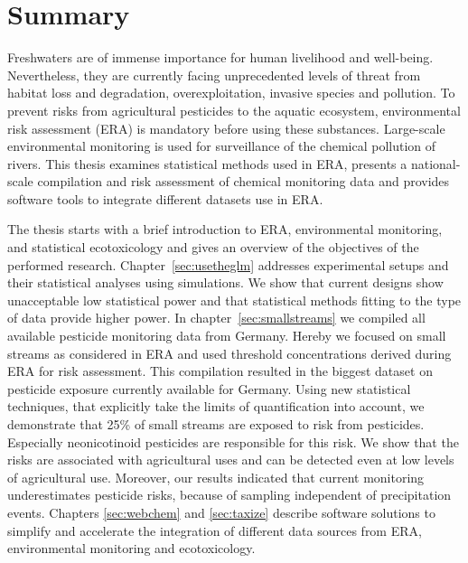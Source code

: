 



\thispagestyle{empty}
\begingroup
\let\clearpage\relax
\let\cleardoublepage\relax
\let\cleardoublepage\relax
\chapter*{Summary}
\thispagestyle{empty}

Freshwaters are of immense importance for human livelihood and well-being.
Nevertheless, they are currently facing unprecedented levels of threat from habitat loss and degradation, overexploitation, invasive species and
pollution. To prevent risks from agricultural pesticides to the aquatic ecosystem, environmental risk assessment (ERA) is mandatory before using these substances. Large-scale environmental monitoring is used for surveillance of the chemical pollution of rivers. 
This thesis examines statistical methods used in ERA, presents a national-scale compilation and risk assessment of chemical monitoring data and provides software tools to integrate different datasets use in ERA.

The thesis starts with a brief introduction to ERA, environmental monitoring, and statistical ecotoxicology and gives an overview of the objectives of the performed research.
Chapter~\ref{sec:usetheglm} addresses experimental setups and their statistical analyses using simulations. We show that current designs show unacceptable low statistical power and that statistical methods fitting to the type of data provide higher power. 
In chapter~\ref{sec:smallstreams} we compiled all available pesticide monitoring data from Germany.
Hereby we focused on small streams as considered in ERA and used threshold concentrations derived during ERA for risk assessment.
This compilation resulted in the biggest dataset on pesticide exposure currently available for Germany.
Using new statistical techniques, that explicitly take the limits of quantification into account, we demonstrate that 25\% of small streams are exposed to risk from pesticides. 
Especially neonicotinoid pesticides are responsible for this risk.
We show that the risks are associated with agricultural uses and can be detected even at low levels of agricultural use. Moreover, our results indicated that current monitoring underestimates pesticide risks, because of sampling independent of precipitation events.
Chapters \ref{sec:webchem} and \ref{sec:taxize} describe software solutions to simplify and accelerate the integration of different data sources 
from ERA, environmental monitoring and ecotoxicology.

